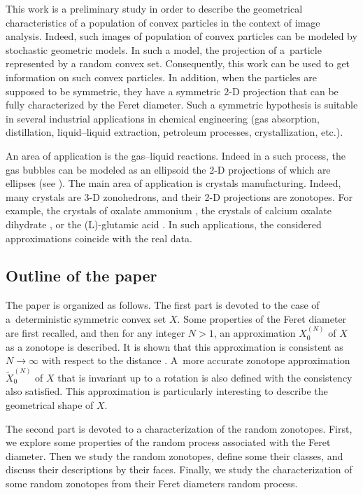 \documentclass[numbers,compress,v1.0.1]{vmsta}
\theoremstyle{definition}
\begin{document}
This work is a preliminary study in order to describe the geometrical
characteristics of a population of convex particles in the context of
image analysis. Indeed, such images of population of convex particles
can be modeled by stochastic geometric models. In such a model, the
projection of a~particle represented by a random convex set.
Consequently, this work can be used to get information on such convex
particles. In addition, when the particles are supposed to be
symmetric, they have a symmetric 2-D projection that can be fully
characterized by the Feret diameter. Such a symmetric hypothesis is
suitable in several industrial applications in chemical engineering
(gas absorption, distillation, liquid--liquid extraction, petroleum
processes, crystallization, etc.).

An area of application is the gas--liquid reactions. Indeed in a such
process, the gas bubbles can be modeled as an ellipsoid the 2-D
projections of which are ellipses (see \citep
{zhang2012method,zafari2015segmentation,buwa2002dynamics}).
The main area of application is crystals manufacturing. Indeed, many
crystals are 3-D zonohedrons, and their 2-D projections are zonotopes.
For example, the crystals of oxalate ammonium \cite
{ICSIA,ahmad2011geometric}, the crystals of calcium oxalate dihydrate
\cite{zhang2002morphological}, or the (L)-glutamic acid \cite{presl28}.
In such applications, the considered approximations coincide with the
real data.

\subsection{Outline of the paper}
The paper is organized as follows.
The first part is devoted to the case of a~deterministic symmetric
convex set $X$. Some properties of the Feret diameter are first
recalled, and then for any integer $N>1$, an approximation $X^{(N)}_0$
of $X$ as a zonotope \cite{eppstein1996zonohedra} is described. It is
shown that this approximation is consistent as $N\rightarrow\infty$
with respect to the  distance \cite{schneider2013convex}.
A~more accurate zonotope approximation $\tilde{X}^{(N)}_0$ of $X$ that
is invariant up to a rotation is also defined with the consistency also
satisfied. This approximation is particularly interesting to describe
the geometrical shape of $X$.

The second part is devoted to a characterization of the random
zonotopes. First, we explore some properties of the random process
associated with the Feret diameter. Then we study the random zonotopes,
define some their classes, and discuss their descriptions by their
faces. Finally, we study the characterization of some random zonotopes
from their Feret diameters random process.
\end{document}
